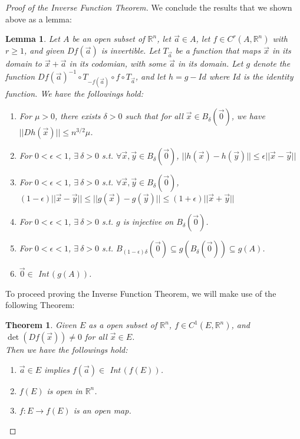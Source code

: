 \documentclass[11pt,oneside]{book}
\theoremstyle{break}
\theoremstyle{break}
\newtheorem{thm}{Theorem}[section]
\newtheorem{lem}{Lemma}[thm]
\newcommand{\R}{\mathbb{R}}
\begin{document}
\begin{proof}[Proof of the Inverse Function Theorem]
We conclude the results that we shown above as a lemma:

\begin{lem}
\setlength{\leftskip}{1cm} Let $A$ be an open subset of $\R^n$, let $\vec{a}\in A$, let $f\in C^r(A,\R^n)$ with $r\geq 1$, and given $Df(\vec{a})$ is invertible. Let $T_{\vec{a}}$ be a function that maps $\vec{x}$ in its domain to $\vec{x}+\vec{a}$ in its codomian, with some $\vec{a}$ in its domain. Let $g$ denote the function $Df(\vec{a})^{-1}\circ T_{-f(\vec{a})} \circ f\circ T_{\vec{a}}$, and let $h = g-Id$ where $Id$ is the identity function. We have the followings hold:
\begin{enumerate}[topsep=3pt,itemsep=-1ex,partopsep=1ex,parsep=1ex,leftmargin=1.5cm]
\item For $\mu>0$, there exists $\delta>0$ such that for all $\vec{x}\in B_\delta(\vec{0})$, we have $||Dh(\vec{x})||\leq n^{3/2}\mu$.
\item For $0<\epsilon<1$, $\exists\ \delta>0$ s.t. $\forall \vec{x},\vec{y}\in B_\delta(\vec{0})$, $||h(\vec{x})-h(\vec{y})|| \leq \epsilon ||\vec{x}-\vec{y}||$
\item For $0<\epsilon<1$, $\exists\ \delta>0$ s.t. $\forall  \vec{x},\vec{y}\in B_\delta(\vec{0})$, $(1-\epsilon)||\vec{x}-\vec{y}|| \leq ||g(\vec{x})-g(\vec{y})|| \leq (1+\epsilon)||\vec{x}+\vec{y}||$
\item For $0<\epsilon<1$, $\exists\ \delta>0$ s.t. $g$ is injective on $B_{\delta}(\vec{0})$.
\item For $0<\epsilon<1$, $\exists\ \delta>0$ s.t. $B_{(1-\epsilon)\delta}(\vec{0}) \subseteq g(B_{\delta}(\vec{0}))\subseteq g(A)$.
\item $\vec{0}\in $ Int\,$(g(A))$.
\end{enumerate}
\end{lem}

To proceed proving the Inverse Function Theorem, we will make use of the following Theorem:

\begin{thm}
\setlength{\leftskip}{1cm} Given $E$ as a open subset of $\R^n$, $f \in C^1(E,\R^n)$, and $\det(Df(\vec{x})) \neq 0$ for all $\vec{x}\in E$. \\Then we have the followings hold:
\begin{enumerate}[topsep=3pt,itemsep=-1ex,partopsep=1ex,parsep=1ex,leftmargin=1.5cm]
\item $\vec{a}\in E$ implies $f(\vec{a}) \in $ Int\,$(f(E))$.
\item $f(E)$ is open in $\R^n$.
\item $f:E \to f(E)$ is an open map.
\end{enumerate}
\end{thm}


\end{proof}
\end{document}

